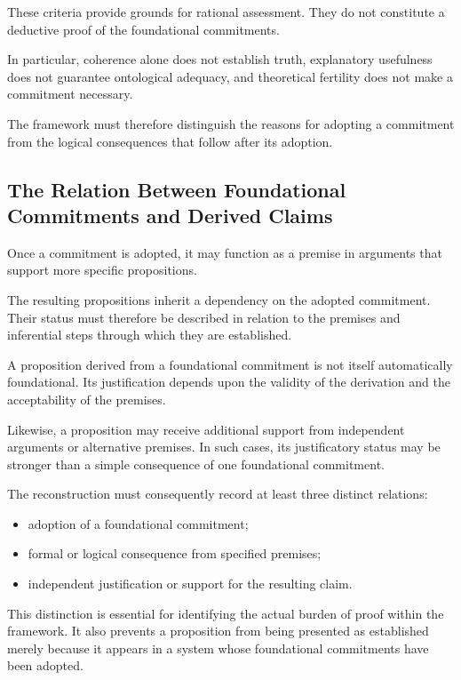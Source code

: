 These criteria provide grounds for rational
assessment. They do not constitute a deductive
proof of the foundational commitments.

In particular, coherence alone does not establish
truth, explanatory usefulness does not guarantee
ontological adequacy, and theoretical fertility
does not make a commitment necessary.

The framework must therefore distinguish
the reasons for adopting a commitment from
the logical consequences that follow after
its adoption.

\subsection{The Relation Between Foundational Commitments and Derived Claims}

Once a commitment is adopted, it may function
as a premise in arguments that support more
specific propositions.

The resulting propositions inherit a dependency
on the adopted commitment. Their status
must therefore be described in relation
to the premises and inferential steps
through which they are established.

A proposition derived from a foundational
commitment is not itself automatically
foundational. Its justification depends
upon the validity of the derivation and
the acceptability of the premises.

Likewise, a proposition may receive additional
support from independent arguments or
alternative premises. In such cases, its
justificatory status may be stronger than
a simple consequence of one foundational
commitment.

The reconstruction must consequently
record at least three distinct relations:

\begin{itemize}
    \item adoption of a foundational commitment;
    \item formal or logical consequence from
    specified premises;
    \item independent justification or support
    for the resulting claim.
\end{itemize}

This distinction is essential for identifying
the actual burden of proof within the
framework. It also prevents a proposition
from being presented as established merely
because it appears in a system whose
foundational commitments have been adopted.

